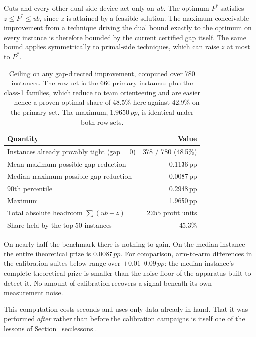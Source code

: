 \documentclass[11pt,a4paper]{article}
\newcommand{\pp}{\,pp}
\begin{document}
Cuts and every other dual-side device act only on $ub$. The optimum $P^\ast$
satisfies $z\le P^\ast\le ub$, since $z$ is attained by a feasible solution. The
maximum conceivable improvement from a technique driving the dual bound exactly to
the optimum on every instance is therefore bounded by the current certified gap
itself. The same bound applies symmetrically to primal-side techniques, which can
raise $z$ at most to $P^\ast$.

\begin{table}[htbp]
\centering
\caption{Ceiling on any gap-directed improvement, computed over 780 instances.
The row set is the 660 primary instances plus the class-1 families, which reduce
to team orienteering and are easier --- hence a proven-optimal share of 48.5\% here
against 42.9\% on the primary set. The maximum, $1.9650\pp$, is identical under
both row sets.}
\label{tab:ceiling}
\begin{tabular}{lr}
\toprule
Quantity & Value \\
\midrule
Instances already provably tight ($\text{gap}=0$) & 378 / 780 \;(48.5\%) \\
Mean maximum possible gap reduction & 0.1136\pp \\
Median maximum possible gap reduction & 0.0087\pp \\
90th percentile & 0.2948\pp \\
Maximum & 1.9650\pp \\
\midrule
Total absolute headroom $\sum(ub-z)$ & 2255 profit units \\
Share held by the top 50 instances & 45.3\% \\
\bottomrule
\end{tabular}
\end{table}

On nearly half the benchmark there is nothing to gain. On the median instance the
entire theoretical prize is $0.0087\pp$. For comparison, arm-to-arm differences in
the calibration suites below range over $\pm0.01$--$0.09\pp$: the median instance's
complete theoretical prize is smaller than the noise floor of the apparatus built
to detect it. No amount of calibration recovers a signal beneath its own
measurement noise.

This computation costs seconds and uses only data already in hand. That it was
performed \emph{after} rather than before the calibration campaigns is itself one
of the lessons of Section~\ref{sec:lessons}.

\end{document}
